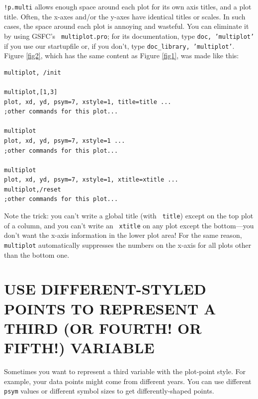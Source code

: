 \documentclass[psfig,preprint]{aastex}
\begin{document}
{\tt !p.multi} allows enough space around each plot for its own axis
titles, and a plot title. Often, the x-axes and/or the y-axes have
identical titles or scales. In such cases, the space around each plot is
annoying and wasteful. You can eliminate it by using GSFC's {\tt
  multiplot.pro}; for its documentation, type {\tt doc, 'multiplot'} if
you use our startupfile or, if you don't, type {\tt doc\_library,
  'multiplot'}. Figure \ref{fig2}, which has the same content as Figure
\ref{fig1}, was made like this:

\begin{verbatim}
multiplot, /init

multiplot,[1,3]
plot, xd, yd, psym=7, xstyle=1, title=title ...
;other commands for this plot...

multiplot
plot, xd, yd, psym=7, xstyle=1 ...
;other commands for this plot...

multiplot
plot, xd, yd, psym=7, xstyle=1, xtitle=xtitle ...
multiplot,/reset
;other commands for this plot...
\end{verbatim}

\noindent Note the trick: you can't write a global title (with {\tt
  title}) except on the top plot of a column, and you can't write an {\tt
  xtitle} on any plot except the bottom---you don't want the x-axis
information in the lower plot area! For the same reason, {\tt multiplot}
automatically suppresses the numbers on the x-axis for all plots other
than the bottom one.

\section{USE DIFFERENT-STYLED POINTS TO REPRESENT A THIRD (OR
  FOURTH! OR FIFTH!) VARIABLE}

Sometimes you want to represent a third variable with the plot-point
style. For example, your data points might come from different
years. You can use different {\tt psym} values or different symbol sizes
to get differently-shaped
points. 
\end{document}
